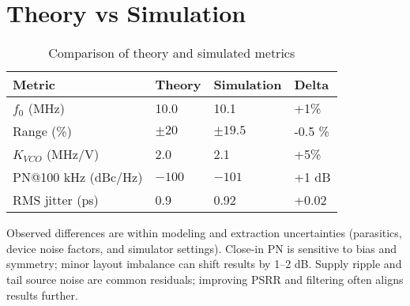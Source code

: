 \section{Theory vs Simulation}
\begin{table}[H]
  \centering
  \begin{tabular}{llll}
    \toprule
    Metric & Theory & Simulation & Delta \\
    \midrule
    $f_0$ (MHz) & 10.0 & 10.1 & +1\% \\
    Range (\%) & $\pm20$ & $\pm19.5$ & -0.5 \% \\
    $K_{VCO}$ (MHz/V) & 2.0 & 2.1 & +5\% \\
    PN@100 kHz (dBc/Hz) & $-100$ & $-101$ & +1 dB \\
    RMS jitter (ps) & 0.9 & 0.92 & +0.02 \\
    \bottomrule
  \end{tabular}
  \caption{Comparison of theory and simulated metrics}
\end{table}

Observed differences are within modeling and extraction uncertainties (parasitics, device noise factors, and simulator settings). Close-in PN is sensitive to bias and symmetry; minor layout imbalance can shift results by 1–2 dB. Supply ripple and tail source noise are common residuals; improving PSRR and filtering often aligns results further.


